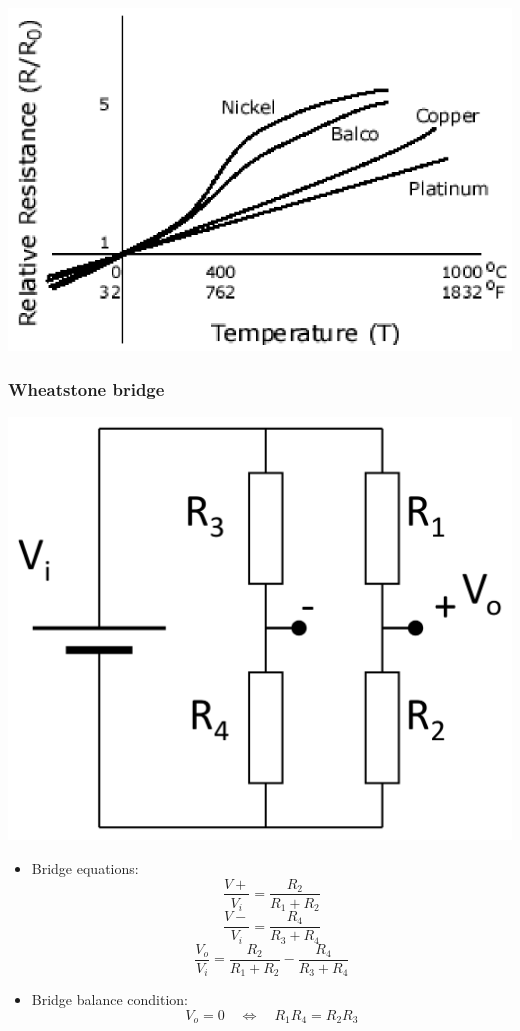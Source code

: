 \documentclass[11pt]{article}
\begin{document}
\begin{center}
\includegraphics[width=.9\linewidth]{./images/resistance-vs-temperature-graph.png}
\end{center}
\subsubsection{Wheatstone bridge}
\label{sec:org28a7d68}
\begin{center}
\includegraphics[width=.9\linewidth]{./images/wheatstone-bridge-circuit-diagram.png}
\end{center}
\begin{itemize}
\item Bridge equations:
\[\frac{V+}{V_i} = \frac{R_2}{R_1 + R_2}\]
\[\frac{V-}{V_i} = \frac{R_4}{R_3 + R_4}\]
\[\frac{V_o}{V_i} = \frac{R_2}{R_1 + R_2} - \frac{R_4}{R_3 + R_4}\]
\item Bridge balance condition:
\[V_o = 0 \quad \Leftrightarrow \quad R_1 R_4 = R_2 R_3\]
\end{itemize}
\end{document}
